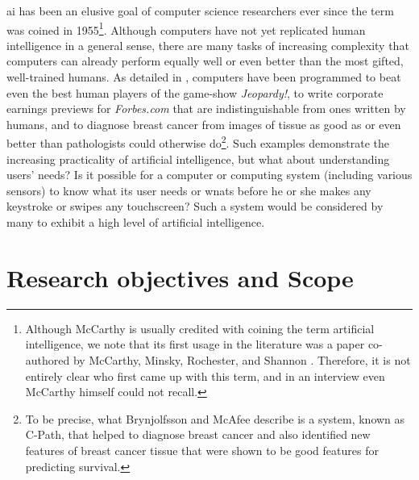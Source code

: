 \gls{ai} has been an elusive goal of computer science researchers ever since the term was coined in 1955\footnote{Although McCarthy is usually credited with coining the term artificial intelligence, we note that its first usage in the literature was a paper co-authored by McCarthy, Minsky, Rochester, and Shannon \cite{McCarthy1955}. Therefore, it is not entirely clear who first came up with this term, and in an interview even McCarthy himself could not recall.}. Although computers have not yet replicated human intelligence in a general sense, there are many tasks of increasing complexity that computers can already perform equally well or even better than the most gifted, well-trained humans. As detailed in \cite{brynjolfsson_2014}, computers have been programmed to beat even the best human players of the game-show \emph{Jeopardy!}, to write corporate earnings previews for \emph{Forbes.com} that are indistinguishable from ones written by humans, and to diagnose breast cancer from images of tissue as good as or even better than pathologists could otherwise do\footnote{To be precise, what Brynjolfsson and McAfee describe is a system, known as C-Path, that helped to diagnose breast cancer and also identified new features of breast cancer tissue that were shown to be good features for predicting survival.}. Such examples demonstrate the increasing practicality of artificial intelligence, but what about understanding users' needs? Is it possible for a computer or computing system (including various sensors) to know what its user needs or wnats before he or she makes any keystroke or swipes any touchscreen? Such a system would be considered by many to exhibit a high level of artificial intelligence.

\section{Research objectives and Scope}
\label{sec:objectives}

